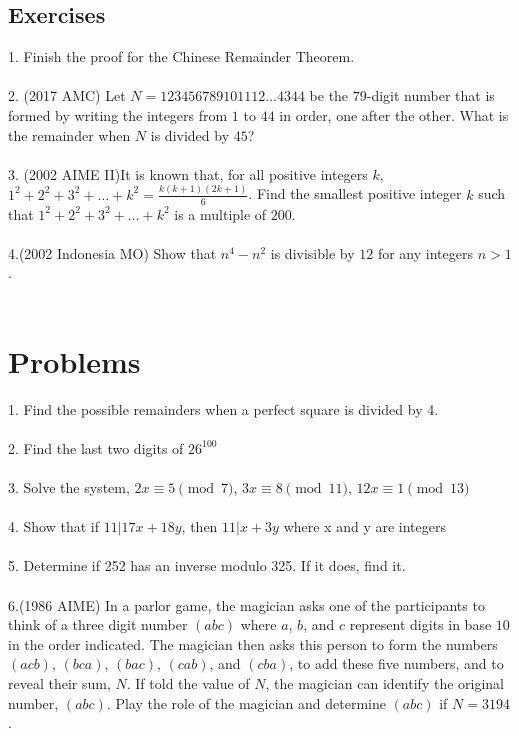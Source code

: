 \documentclass[letterpaper]{article}
\theoremstyle{plain}
\theoremstyle{definition}
\theoremstyle{remark}
\begin{document}
\subsection*{Exercises}
1. Finish the proof for the Chinese Remainder Theorem.\\\\
2. (2017 AMC) Let $N=123456789101112\dots4344$ be the $79$-digit number that is formed by writing the integers from $1$ to $44$ in order, one after the other. What is the remainder when $N$ is divided by $45$?\\\\
3. (2002 AIME II)It is known that, for all positive integers $k$,\\
$1^2+2^2+3^2+\ldots+k^{2}=\frac{k(k+1)(2k+1)}6$.
Find the smallest positive integer $k$ such that $1^2+2^2+3^2+\ldots+k^2$ is a multiple of $200$.\\\\
4.(2002 Indonesia MO) Show that $n^4 - n^2$ is divisible by $12$ for any integers $n > 1$.\\\\

\section{Problems}
1. Find the possible remainders when a perfect square is divided by 4.\\\\
2. Find the last two digits of $26^{100}$\\\\
3. Solve the system, $2x \equiv 5 \pmod{7}$, $3x \equiv 8 \pmod{11}$, $12x \equiv 1 \pmod{13}$\\\\
4. Show that if $11 | 17x+18y$, then $11 | x+3y$ where x and y are integers\\\\
5. Determine if 252 has an inverse modulo 325. If it does, find it.\\\\
6.(1986 AIME) In a parlor game, the magician asks one of the participants to think of a three digit number $(abc)$ where $a$, $b$, and $c$ represent digits in base $10$ in the order indicated. The magician then asks this person to form the numbers $(acb)$, $(bca)$, $(bac)$, $(cab)$, and $(cba)$, to add these five numbers, and to reveal their sum, $N$. If told the value of $N$, the magician can identify the original number, $(abc)$. Play the role of the magician and determine $(abc)$ if $N= 3194$.\\\\
\end{document}
